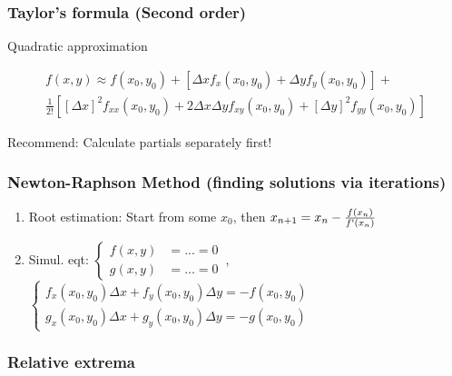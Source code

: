 \subsubsection*{Taylor's formula (Second order)}
Quadratic approximation
\begin{mdframed}[style=theorem]
	\begin{multline*}
	f(x, y) \approx f(x_0, y_0) + \left[\Delta x f_x(x_0, y_0) + \Delta y f_y(x_0, y_0)\right] + \\ \frac{1}{2!} \left[\left[\Delta x\right]^2 f_{xx}(x_0, y_0) + 2\Delta x\Delta y f_{xy}(x_0, y_0) + \left[\Delta y\right]^2 f_{yy}(x_0, y_0)\right]
	\end{multline*}
	
	\smallskip
	Recommend: Calculate partials separately first!
\end{mdframed}

\subsubsection*{Newton-Raphson Method (finding solutions via iterations)}

\begin{mdframed}[style=theorem]
	\begin{enumerate}[label=(\Alph*)]
		\item Root estimation: Start from some $x_0$, then $x_{n + 1} = x_n - \frac{f(x_n)}{f\textnormal{\textquotesingle}(x_n)}$
		\item Simul. eqt: $ \begin{cases}
		f(x, y) &= ... = 0 \\
		g(x, y) &= ... = 0
		\end{cases}\, $, $ \begin{cases}
		f_x(x_0, y_0)\Delta x + f_y(x_0, y_0)\Delta y = -f(x_0, y_0) \\
		g_x(x_0, y_0)\Delta x + g_y(x_0, y_0)\Delta y = -g(x_0, y_0)
		\end{cases}\, $
	\end{enumerate}
\end{mdframed}

\subsubsection*{Relative extrema}

